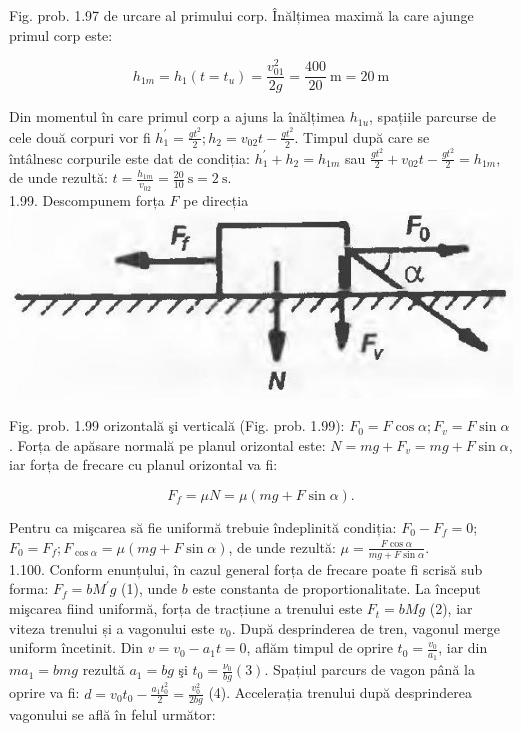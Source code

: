 \documentclass[10pt]{article}
\begin{document}
Fig. prob. 1.97 de urcare al primului corp. Înălțimea maximă la care ajunge primul corp este:

$$
h_{1 m}=h_{1}\left(t=t_{u}\right)=\frac{v_{01}^{2}}{2 g}=\frac{400}{20} \mathrm{~m}=20 \mathrm{~m}
$$

Din momentul în care primul corp a ajuns la înălțimea $h_{1 u}$, spațiile parcurse de cele două corpuri vor fi $h_{1}^{\prime}=\frac{g t^{2}}{2} ; h_{2}=v_{02} t-\frac{g t^{2}}{2}$. Timpul după care se\\
întâlnesc corpurile este dat de condiția: $h_{1}^{\prime}+h_{2}=h_{1 m}$ sau $\frac{g t^{2}}{2}+v_{02} t-\frac{g t^{2}}{2}=h_{1 m}$, de unde rezultă: $t=\frac{h_{1 m}}{v_{02}}=\frac{20}{10} \mathrm{~s}=2 \mathrm{~s}$.\\
1.99. Descompunem forța $F$ pe direcția\\
\includegraphics[max width=\textwidth, center]{2025_07_01_5b3ff9fa0d508c8e9f17g-218}

Fig. prob. 1.99 orizontală şi verticală (Fig. prob. 1.99): $F_{0}=F \cos \alpha ; F_{v}=F \sin \alpha$. Forța de apăsare normală pe planul orizontal este: $N=m g+F_{v}=m g+F \sin \alpha$, iar forța de frecare cu planul orizontal va fi:

$$
F_{f}=\mu N=\mu(m g+F \sin \alpha) .
$$

Pentru ca mişcarea să fie uniformă trebuie îndeplinită condiția: $F_{0}-F_{f}=0$; $F_{0}=F_{f} ; F_{\cos \alpha}=\mu(m g+F \sin \alpha)$, de unde rezultă: $\mu=\frac{F \cos \alpha}{m g+F \sin \alpha}$.\\
1.100. Conform enunțului, în cazul general forța de frecare poate fi scrisă sub forma: $F_{f}=b M^{\prime} g$ (1), unde $b$ este constanta de proportionalitate. La început mişcarea fiind uniformă, forța de tracțiune a trenului este $F_{t}=b M g$ (2), iar viteza trenului și a vagonului este $v_{0}$. După desprinderea de tren, vagonul merge uniform încetinit. Din $v=v_{0}-a_{1} t=0$, aflăm timpul de oprire $t_{0}=\frac{v_{0}}{a_{1}}$, iar din $m a_{1}=b m g$ rezultă $a_{1}=b g$ şi $t_{0}=\frac{\nu_{0}}{b g}(3)$. Spațiul parcurs de vagon până la oprire va fi: $d=v_{0} t_{0}-\frac{a_{1} t_{0}^{2}}{2}=\frac{v_{0}^{2}}{2 b g}$ (4). Accelerația trenului după desprinderea vagonului se află în felul următor:
\end{document}
